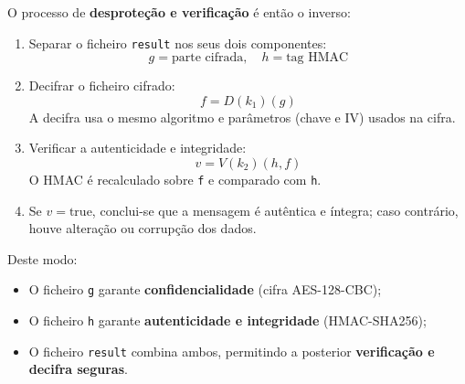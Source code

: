 O processo de \textbf{desproteção e verificação} é então o inverso:

\begin{enumerate}
  \item Separar o ficheiro \texttt{result} nos seus dois componentes:
  \[
  g = \text{parte cifrada}, \quad h = \text{tag HMAC}
  \]
  \item Decifrar o ficheiro cifrado:
  \[
  f = D(k_1)(g)
  \]
  A decifra usa o mesmo algoritmo e parâmetros (chave e IV) usados na cifra.
  \item Verificar a autenticidade e integridade:
  \[
  v = V(k_2)(h, f)
  \]
  O HMAC é recalculado sobre \texttt{f} e comparado com \texttt{h}. 
  \item Se $v = \text{true}$, conclui-se que a mensagem é autêntica e íntegra; caso contrário, houve alteração ou corrupção dos dados.
\end{enumerate}

Deste modo:
\begin{itemize}
  \item O ficheiro \texttt{g} garante \textbf{confidencialidade} (cifra AES-128-CBC);
  \item O ficheiro \texttt{h} garante \textbf{autenticidade e integridade} (HMAC-SHA256);
  \item O ficheiro \texttt{result} combina ambos, permitindo a posterior \textbf{verificação e decifra seguras}.
\end{itemize}
